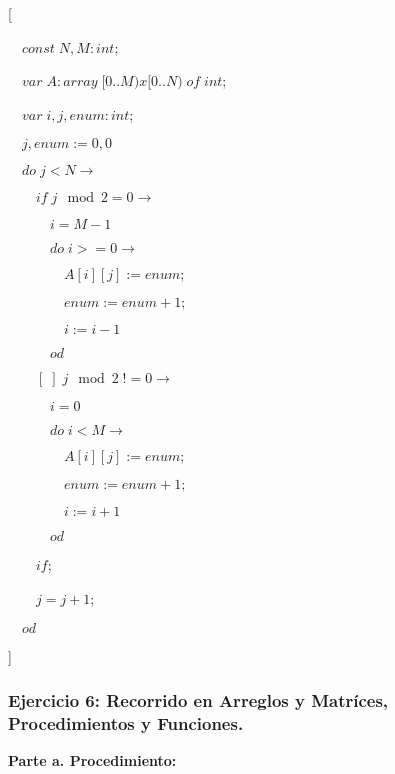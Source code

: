 \documentclass[hidelinks]{article}
\begin{document}
	[ \par
$\quad const \; N, M : int$; \par
$\quad var \; A : array \; [0..M)x[0..N) \; of \; int$; \par
		$\quad var \; i,j, enum : int$; \par
		$\quad j, enum := 0, 0 $ \par
		$\quad do \; j < N \rightarrow $ \par
		$\qquad if \; j \mod 2 = 0 \rightarrow $ \par
		$\qquad \quad i = M-1 $ \par
		$\qquad \quad do \; i >= 0 \rightarrow $ \par
		$\qquad \quad \quad A[i][j] := enum; $ \par
		$\qquad \quad \quad enum := enum + 1; $ \par
		$\qquad \quad \quad i := i - 1 $ \par
		$\qquad \quad od $ \par
		$\qquad [\;] \; j \mod 2 \; != 0 \rightarrow $ \par
		$\qquad \quad i = 0 $ \par
		$\qquad \quad do \; i < M \rightarrow $ \par
		$\qquad \quad \quad A[i][j] := enum; $ \par
		$\qquad \quad \quad enum := enum + 1; $ \par
		$\qquad \quad \quad i := i + 1 $ \par
		$\qquad \quad od $ \par
		$\qquad if $; \par
		$\qquad j = j + 1 $; \par
		$\quad od$ \par
	] \par

\newpage

\subsubsection{Ejercicio 6: Recorrido en Arreglos y Matríces, Procedimientos y Funciones.}


\textbf{Parte a. Procedimiento:}
\end{document}
